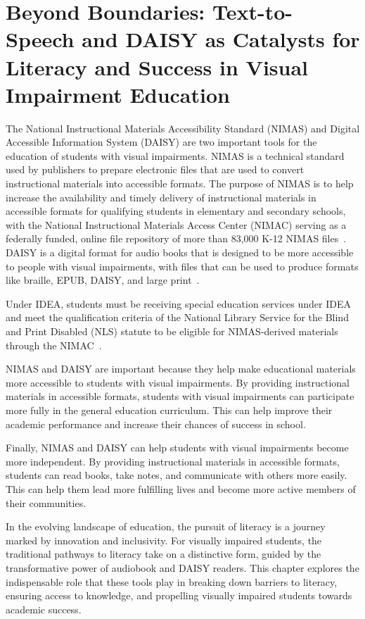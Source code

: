 \chapter{Beyond Boundaries: Text-to-Speech and DAISY as Catalysts for Literacy and Success in Visual Impairment Education}\label{audio}

The National Instructional Materials Accessibility Standard (NIMAS) and Digital Accessible Information System (DAISY) are two important tools for the education of students with visual impairments. NIMAS is a technical standard used by publishers to prepare electronic files that are used to convert instructional materials into accessible formats. The purpose of NIMAS is to help increase the availability and timely delivery of instructional materials in accessible formats for qualifying students in elementary and secondary schools, with the National Instructional Materials Access Center (NIMAC) serving as a federally funded, online file repository of more than 83,000 K-12 NIMAS files~\cite{NIMAC2025}. DAISY is a digital format for audio books that is designed to be more accessible to people with visual impairments, with files that can be used to produce formats like braille, EPUB, DAISY, and large print~\cite{DAISY2024}.

Under IDEA, students must be receiving special education services under IDEA and meet the qualification criteria of the National Library Service for the Blind and Print Disabled (NLS) statute to be eligible for NIMAS-derived materials through the NIMAC~\cite{CTEducation2025}.

NIMAS and DAISY are important because they help make educational materials more accessible to students with visual impairments. By providing instructional materials in accessible formats, students with visual impairments can participate more fully in the general education curriculum. This can help improve their academic performance and increase their chances of success in school.

Finally, NIMAS and DAISY can help students with visual impairments become more independent. By providing instructional materials in accessible formats, students can read books, take notes, and communicate with others more easily. This can help them lead more fulfilling lives and become more active members of their communities.

In the evolving landscape of education, the pursuit of literacy is a journey marked by innovation and inclusivity. For visually impaired students, the traditional pathways to literacy take on a distinctive form, guided by the transformative power of audiobook and DAISY readers. This chapter explores the indispensable role that these tools play in breaking down barriers to literacy, ensuring access to knowledge, and propelling visually impaired students towards academic success.


